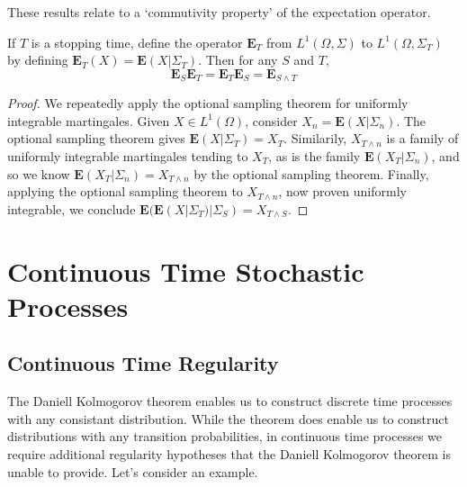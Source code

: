 These results relate to a `commutivity property' of the expectation operator.

\begin{theorem}
    If $T$ is a stopping time, define the operator $\mathbf{E}_T$ from $L^1(\Omega, \Sigma)$ to $L^1(\Omega, \Sigma_T)$ by defining $\mathbf{E}_T(X) = \mathbf{E}(X|\Sigma_T)$. Then for any $S$ and $T$,
    \[ \mathbf{E}_S \mathbf{E}_T = \mathbf{E}_T \mathbf{E}_S = \mathbf{E}_{S \wedge T} \]
\end{theorem}
\begin{proof}
    We repeatedly apply the optional sampling theorem for uniformly integrable martingales. Given $X \in L^1(\Omega)$, consider $X_n = \mathbf{E}(X|\Sigma_n)$. The optional sampling theorem gives $\mathbf{E}(X|\Sigma_T) = X_T$. Similarily, $X_{T \wedge n}$ is a family of uniformly integrable martingales tending to $X_T$, as is the family $\mathbf{E}(X_T|\Sigma_n)$, and so we know $\mathbf{E}(X_T|\Sigma_n) = X_{T \wedge n}$ by the optional sampling theorem. Finally, applying the optional sampling theorem to $X_{T \wedge n}$, now proven uniformly integrable, we conclude $\mathbf{E}(\mathbf{E}(X|\Sigma_T)|\Sigma_S) = X_{T \wedge S}$.
\end{proof}

\part{Continuous Time Stochastic Processes}

\chapter{Continuous Time Regularity}

The Daniell Kolmogorov theorem enables us to construct discrete time processes with any consistant distribution. While the theorem does enable us to construct distributions with any transition probabilities, in continuous time processes we require additional regularity hypotheses that the Daniell Kolmogorov theorem is unable to provide. Let's consider an example.

